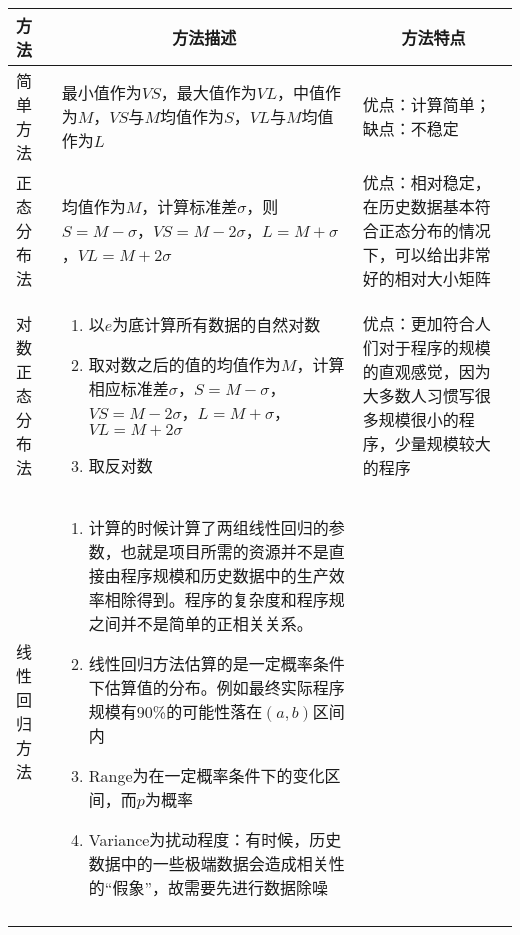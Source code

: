 \vspace{-0.5em}
\begin{spacing}{1.2}
    \centering
    \begin{longtable}{|m{1.5cm}<{\centering}|m{7cm}|m{6cm}|}
        \hline
        \textbf{方法} & \multicolumn{1}{c|}{\textbf{方法描述}} & \multicolumn{1}{c|}{\textbf{方法特点}} \\ \hline
        简单方法
        & 最小值作为$VS$，最大值作为$VL$，中值作为$M$，$VS$与$M$均值作为$S$，$VL$与$M$均值作为$L$
        & 优点：计算简单；缺点：不稳定 \\ \hline
        正态分布法
        & 均值作为$M$，计算标准差$\sigma$，则$S=M-\sigma$，$VS=M-2\sigma$，$L=M+\sigma$，$VL=M+2\sigma$
        & 优点：相对稳定，在历史数据基本符合正态分布的情况下，可以给出非常好的相对大小矩阵 \\ \hline
        对数正态分布法
        & \vspace{-1em}
        \begin{enumerate}[label=\arabic*.,leftmargin=1em]
            \item 以$e$为底计算所有数据的自然对数
            \item 取对数之后的值的均值作为$M$，计算相应标准差$\sigma$，$S=M-\sigma$，$VS=M-2\sigma$，$L=M+\sigma$，$VL=M+2\sigma$
            \item 取反对数
        \vspace{-1.3em}
        \end{enumerate}
        & 优点：更加符合人们对于程序的规模的直观感觉，因为大多数人习惯写很多规模很小的程序，少量规模较大的程序 \\ \hline
        线性回归方法
        & \vspace{-1em}
        \begin{enumerate}[label=\arabic*.,leftmargin=1em]
            \item 计算的时候计算了两组线性回归的参数，也就是项目所需的资源并不是直接由程序规模和历史数据中的生产效率相除得到。程序的复杂度和程序规之间并不是简单的正相关关系。
            \item 线性回归方法估算的是一定概率条件下估算值的分布。例如最终实际程序规模有90\%的可能性落在$(a, b)$区间内
            \item Range为在一定概率条件下的变化区间，而$p$为概率
            \item Variance为扰动程度：有时候，历史数据中的一些极端数据会造成相关性的“假象”，故需要先进行数据除噪
            \vspace{-1em}
            $$\begin{array}{l}

\end{array}$$
\end{enumerate}
\end{longtable}
\end{spacing}
